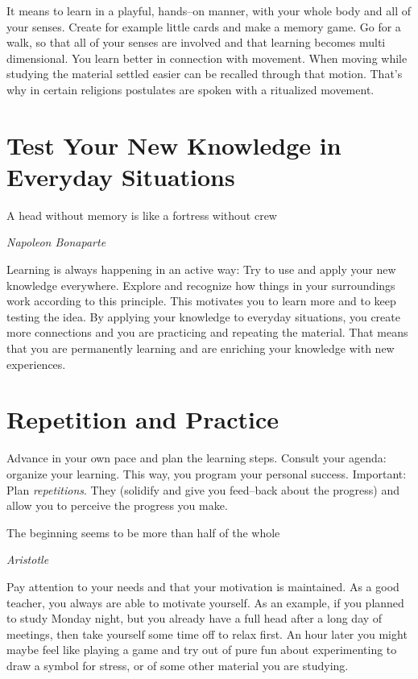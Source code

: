 \documentclass[../main.tex]{subfiles}
\begin{document}
It means to learn in a {playful}, {hands--on} manner, with your {whole body and all of your senses}.
Create for example little cards and make a {memory game}. Go for a {walk}, so that all of your senses are involved and that learning becomes multi dimensional.
You {learn better} {in connection with movement}.
When moving while studying the material settled easier  can  be {recalled through that motion}.
{That's why in certain religions postulates are spoken with a ritualized movement.}

\section[Test Your New Knowledge]{Test Your New Knowledge in Everyday Situations}

\epigraph{A head without memory is like a fortress without crew}{\textit{Napoleon Bonaparte}}

Learning is always happening in an active way: Try to {use} and apply your new knowledge {everywhere}.
 Explore and recognize how {things in your surroundings} work according to this principle. 
 This {motivates you to learn} more and to keep testing the idea. 
 By applying your knowledge to everyday situations, you create more connections and you are  {practicing and repeating the material}.
 That means that you are permanently learning and are enriching your knowledge with new experiences.

 \section{Repetition and Practice}

Advance in your own pace and plan the learning steps.
 Consult your agenda: {organize your learning}.
This way, you {program your personal success}.
{Important:} Plan \emph{repetitions}. They (solidify and give you feed--back about the progress) and allow you to perceive the progress you make.

\epigraph{The beginning seems to be more than half of the whole}{\textit{Aristotle}}

Pay attention to your {needs} and that your motivation is maintained. As a good teacher, you always are able to {motivate yourself.}
As an example, if you planned to study Monday night, but you already have a full head after a long day of meetings, then take yourself some time off to relax first. An hour later you might maybe feel like playing a game and try out of pure fun about experimenting to draw a symbol for stress, or of some other material you are studying.
\end{document}
